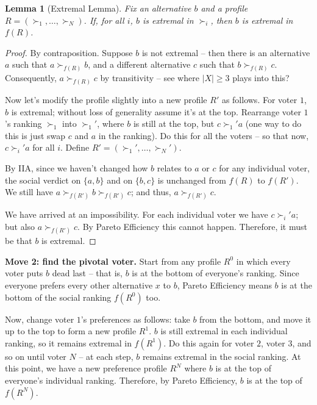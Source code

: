 \documentclass[12pt]{article}
\newtheorem{lemma}[theorem]{Lemma}
\theoremstyle{definition}
\theoremstyle{remark}
\theoremstyle{plain}                          %
\begin{document}
\begin{lemma}[Extremal Lemma]
\label{lem:extremal}
Fix an alternative $b$ and a profile $R=(\succ_1,\dots,\succ_N)$. If, for all $i$, $b$ is extremal in $\succ_i$, then $b$ is extremal in $f(R)$.
\end{lemma}
 
\begin{proof}
By contraposition. Suppose $b$ is not extremal -- then there is an alternative $a$ such that $a \succ_{f(R)} b$, and a different alternative $c$ such that $b \succ_{f(R)} c$. Consequently, $a \succ_{f(R)} c$ by transitivity -- see where $|X| \geq 3$ plays into this?
 
Now let's modify the profile slightly into a new profile $R'$ as follows. For voter $1$, $b$ is extremal; without loss of generality assume it's at the top. Rearrange voter $1$'s ranking $\succ_1$ into $\succ_1'$, where $b$ is still at the top, but $c \succ_1' a$ (one way to do this is just swap $c$ and $a$ in the ranking). Do this for all the voters -- so that now, $c \succ_i' a$ for all $i$. Define $R'=(\succ_1',\dots,\succ_N')$.
 
By IIA, since we haven't changed how $b$ relates to $a$ or $c$ for any individual voter, the social verdict on $\{a,b\}$ and on $\{b,c\}$ is unchanged from $f(R)$ to $f(R')$. We still have $a \succ_{f(R')} b \succ_{f(R')} c$; and thus, $a \succ_{f(R')} c$.

We have arrived at an impossibility. For each individual voter we have $c \succ_i' a$; but also $a \succ_{f(R')} c$. By Pareto Efficiency this cannot happen. Therefore, it must be that $b$ is extremal.
\end{proof}
 
\noindent\textbf{Move 2: find the pivotal voter.}
Start from any profile $R^{0}$ in which every voter puts $b$ dead last -- that is, $b$ is at the bottom of everyone's ranking. Since everyone prefers every other alternative $x$ to $b$, Pareto Efficiency means $b$ is at the bottom of the social ranking $f(R^0)$ too.
 
Now, change voter $1$'s preferences as follows: take $b$ from the bottom, and move it up to the top to form a new profile $R^1$. $b$ is still extremal in each individual ranking, so it remains extremal in $f(R^1)$. Do this again for voter $2$, voter $3$, and so on until voter $N$ -- at each step, $b$ remains extremal in the social ranking. At this point, we have a new preference profile $R^N$ where $b$ is at the top of everyone's individual ranking. Therefore, by Pareto Efficiency, $b$ is at the top of $f(R^N)$.
 
\end{document}
